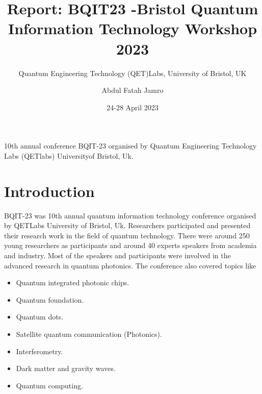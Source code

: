 \documentclass[a4paper, 12pt]{scrartcl}
\title{Report: BQIT23 -Bristol Quantum Information Technology Workshop 2023}
\subtitle{Quantum Engineering Technology (QET)Labs, University of Bristol, UK}
\author{Abdul Fatah Jamro}
\date{24-28 April 2023 }
\begin{document}
\maketitle
  10th annual conference BQIT-23 organised by Quantum Engineering Technology
  Labs (QETlabs) Universityof Bristol, Uk.

\section{Introduction}
  BQIT-23 was 10th annual quantum information technology conference organised 
  by QETLabs University of Bristol, Uk. Researchers participated and presented 
  their research work in the field of quantum technology. There were around 250
  young researchers as participants and around 40 experts speakers from academia and industry.
  Most of the speakers and participants were involved in the advanced research in quantum photonics. 
  The conference also covered topics like 

\begin{itemize}
  \item Quantum integrated photonic chips.
  \item Quantum foundation.
  \item Quantum dots.
  \item Satellite quantum communication (Photonics).
  \item Interferometry.
  \item Dark matter and gravity waves.
  \item Quantum computing.
\end{itemize}
\end{document}

